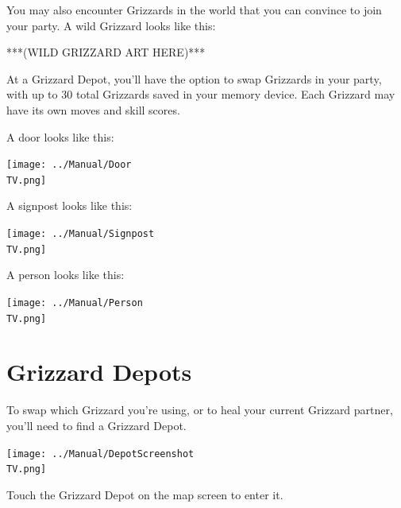 \documentclass[10pt,twocolumn,openany,article]{memoir}
\newcommand\TV{NTSC}
\newcommand\TV{PAL}
\newcommand\TV{SECAM}
\begin{document}
\else

You may also  encounter Grizzards in the world that  you can convince to
join your party. A wild Grizzard looks like this:

***(WILD GRIZZARD ART HERE)***

At a  Grizzard Depot, you'll have  the option to swap  Grizzards in your
party,  with up  to  30 total  Grizzards saved  in  your memory  device.
Each Grizzard may have its own moves and skill scores.

\fi

A door looks like this:

\begin{center}
  \texttt{[image: ../Manual/Door\\TV.png]}
\end{center}

A signpost looks like this:

\begin{center}
  \texttt{[image: ../Manual/Signpost\\TV.png]}
\end{center}

A person looks like this:

\begin{center}
  \texttt{[image: ../Manual/Person\\TV.png]}
\end{center}

\section{Grizzard Depots}

To \ifdefined\NOSAVE\else  swap which  Grizzard you're using,  or to  \fi heal
your current Grizzard partner, you'll need to find a Grizzard Depot.

\texttt{[image: ../Manual/DepotScreenshot\\TV.png]}

Touch the Grizzard Depot on the map screen to enter it.
\end{document}

